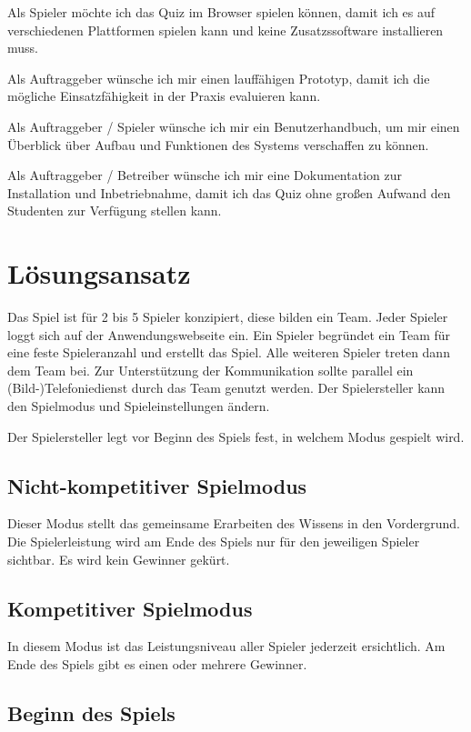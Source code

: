 \documentclass[a4paper,11pt,listof=numbered,glossary=totoc,parskip=half,toc=bib]{scrreprt}
\begin{document}
Als Spieler möchte ich das Quiz im Browser spielen können, damit ich es auf verschiedenen Plattformen spielen kann und keine Zusatzssoftware installieren muss.

Als Auftraggeber wünsche ich mir einen lauffähigen Prototyp, damit ich die mögliche Einsatzfähigkeit in der Praxis evaluieren kann.

Als Auftraggeber / Spieler wünsche ich mir ein Benutzerhandbuch, um mir einen Überblick über Aufbau und Funktionen des Systems verschaffen zu können.

Als Auftraggeber / Betreiber wünsche ich mir eine Dokumentation zur Installation und Inbetriebnahme, damit ich das Quiz ohne großen Aufwand den Studenten zur Verfügung stellen kann.

	\newpage
	
	\section{Lösungsansatz}

Das Spiel ist für 2 bis 5 Spieler konzipiert, diese bilden ein Team.
Jeder Spieler loggt sich auf der Anwendungswebseite ein. Ein Spieler begründet ein Team für eine feste Spieleranzahl und erstellt das Spiel. Alle weiteren Spieler treten dann dem Team bei. Zur Unterstützung der Kommunikation sollte parallel ein (Bild-)Telefoniedienst durch das Team genutzt werden. Der Spielersteller kann den Spielmodus und Spieleinstellungen ändern.

Der Spielersteller legt vor Beginn des Spiels fest, in welchem Modus gespielt wird.

\subsection{Nicht-kompetitiver Spielmodus}

Dieser Modus stellt das gemeinsame Erarbeiten des Wissens in den Vordergrund. Die Spielerleistung wird am Ende des Spiels nur für den jeweiligen Spieler sichtbar. Es wird kein Gewinner gekürt.

\subsection{Kompetitiver Spielmodus}

In diesem Modus ist das Leistungsniveau aller Spieler jederzeit ersichtlich. Am Ende des Spiels gibt es einen oder mehrere Gewinner.


\subsection{Beginn des Spiels}
\end{document}
